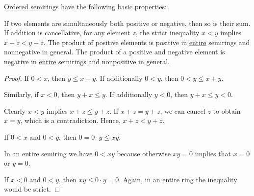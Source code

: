 \begin{proposition}\label{thm:def:ordered_semiring}
  \hyperref[def:ordered_semiring]{Ordered semirings} have the following basic properties:
  \begin{thmenum}
     If two elements are simultaneously both positive or negative, then so is their sum.
     If addition is \hyperref[def:binary_operation/cancellative]{cancellative}, for any element \( z \), the strict inequality \( x < y \) implies \( x + z < y + z \).
     The product of positive elements is positive in \hyperref[def:entire_semiring]{entire} semirings and nonnegative in general.
     The product of a positive and negative element is negative in \hyperref[def:entire_semiring]{entire} semirings and nonpositive in general.
  \end{thmenum}
\end{proposition}
\begin{proof}
   If \( 0 < x \), then \( y \leq x + y \). If additionally \( 0 < y \), then \( 0 < y \leq x + y \).

  Similarly, if \( x < 0 \), then \( y + x \leq y \). If additionally \( y < 0 \), then \( y + x \leq y < 0 \).

   Clearly \( x < y \) implies \( x + z \leq y + z \). If \( x + z = y + z \), we can cancel \( z \) to obtain \( x = y \), which is a contradiction. Hence, \( x + z < y + z \).

   If \( 0 < x \) and \( 0 < y \), then \( 0 = 0 \cdot y \leq xy \).

  In an entire semiring we have \( 0 < xy \) because otherwise \( xy = 0 \) implies that \( x = 0 \) or \( y = 0 \).

   If \( x < 0 \) and \( 0 < y \), then \( xy \leq 0 \cdot y = 0 \). Again, in an entire ring the inequality would be strict.
\end{proof}


